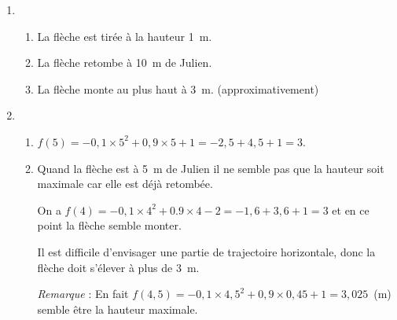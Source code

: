 
\bigskip
 
% 
% 
%

\begin{enumerate}
\item %
	\begin{enumerate}
		\item %
		La flèche est tirée à  la hauteur 1~m. 
		\item %
		La flèche retombe à  10~m de Julien. 
		\item %
		La flèche monte au plus haut à  3~m. (approximativement)
	\end{enumerate} 
\item %
 
%
	\begin{enumerate}
		\item %
$f(5) = - 0,1 \times 5^2 + 0,9 \times 5 + 1 = - 2,5 + 4,5 + 1 = 3$. 
		\item %
Quand la flèche est à  5~m de Julien il ne semble pas que la hauteur soit  maximale car elle est déjà  retombée. 

On a $f(4) = -0,1 \times 4^2 + 0.9 \times 4 -2 = - 1,6 + 3,6 + 1 = 3$ et en ce point la flèche semble monter.

Il est difficile d’envisager une partie de trajectoire horizontale, donc la flèche doit s'élever à  plus de 3~m.

\emph{Remarque} :  En fait $f(4,5) = - 0,1 \times 4,5^2 + 0,9 \times 0,45 + 1 = 3,025$~(m) semble être la hauteur maximale.
	\end{enumerate} 
\end{enumerate} 

\bigskip
 
